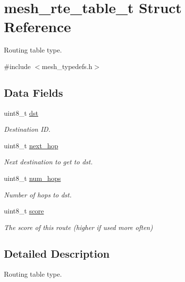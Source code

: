 \hypertarget{structmesh__rte__table__t}{}\section{mesh\+\_\+rte\+\_\+table\+\_\+t Struct Reference}
\label{structmesh__rte__table__t}


Routing table type.  




{\ttfamily \#include $<$mesh\+\_\+typedefs.\+h$>$}

\subsection*{Data Fields}
\begin{DoxyCompactItemize}
\item 
uint8\+\_\+t \hyperlink{structmesh__rte__table__t_adf70843fcea950180ef74a234a67e9e1}{dst}
\begin{DoxyCompactList}\small\item\em Destination ID. \end{DoxyCompactList}\item 
uint8\+\_\+t \hyperlink{structmesh__rte__table__t_a3d98c527447c09e408e15d1dd7539348}{next\+\_\+hop}
\begin{DoxyCompactList}\small\item\em Next destination to get to dst. \end{DoxyCompactList}\item 
uint8\+\_\+t \hyperlink{structmesh__rte__table__t_ad233b151e00a89e6c5fdf63c120ba43b}{num\+\_\+hops}
\begin{DoxyCompactList}\small\item\em Number of hops to dst. \end{DoxyCompactList}\item 
uint8\+\_\+t \hyperlink{structmesh__rte__table__t_a0c297bfd5cce3d28e80e71d8757f009a}{score}
\begin{DoxyCompactList}\small\item\em The score of this route (higher if used more often) \end{DoxyCompactList}\end{DoxyCompactItemize}


\subsection{Detailed Description}
Routing table type. 

